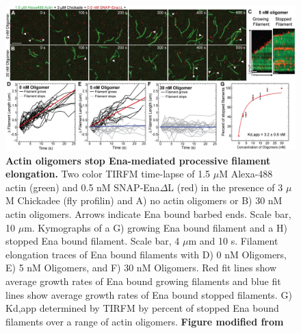 \begin{figure}
\centering
\includegraphics[width=\textwidth]{img/ch04/Oligomer_Ena_Figure.jpg}
\caption[Actin oligomers stop Ena-mediated processive filament elongation.]{\textbf{Actin oligomers stop Ena-mediated processive filament elongation.} Two color TIRFM time-lapse of 1.5 $\mu$M Alexa-488 actin (green) and 0.5 nM SNAP-Ena$\Delta$L (red) in the presence of 3 $\mu$M Chickadee (fly profilin) and A) no actin oligomers or B) 30 nM actin oligomers. Arrows indicate Ena bound barbed ends. Scale bar, 10 $\mu$m. Kymographs of a G) growing Ena bound filament and a H) stopped Ena bound filament. Scale bar, 4 $\mu$m and 10 s. Filament elongation traces of Ena bound filaments with D) 0 nM Oligomers, E) 5 nM Oligomers, and F) 30 nM Oligomers. Red fit lines show average growth rates of Ena bound growing filaments and blue fit lines show average growth rates of Ena bound stopped filaments. G) Kd,app determined by TIRFM by percent of stopped Ena bound filaments over a range of actin oligomers. \textbf{Figure modified from \citep{kudryashova_actin_2018}}}
\label{fig:ena-oligomers}
\end{figure}

